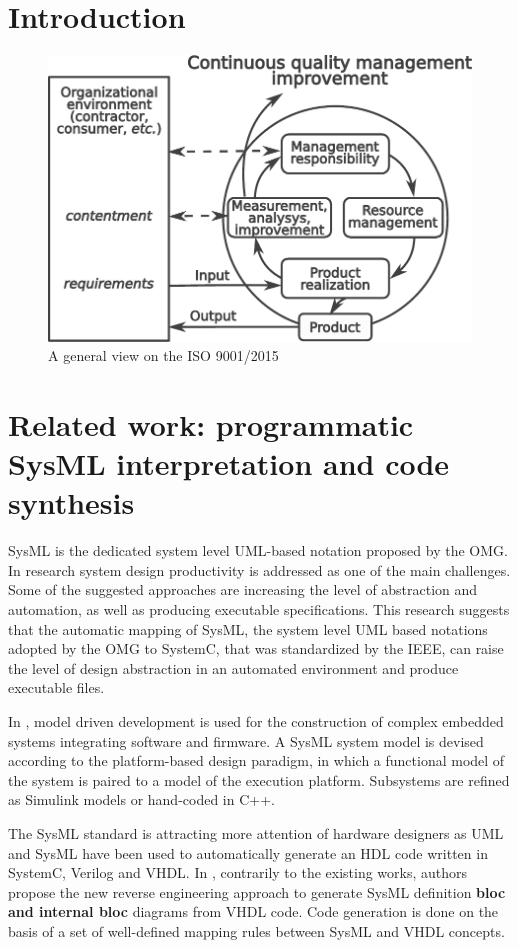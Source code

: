 \documentclass{llncs}
\begin{document}
\section{Introduction}
\label{sec:intro}

\begin{figure}[htb]
  \centering
  \includegraphics[width=0.6\linewidth]{qms-pics/iso9001.pdf}
  \caption{A general view on the ISO 9001/2015}
  \label{fig:iso9001}
\end{figure}


\section{Related work: programmatic SysML interpretation and code synthesis}

SysML is the dedicated system level UML-based notation proposed by the OMG. In research \cite{raslan} system design productivity is addressed as one of the main challenges. Some of the suggested approaches are increasing the level of abstraction and automation, as well as producing executable specifications. This research suggests that the automatic mapping of SysML, the system level UML based notations adopted by the OMG to SystemC, that was standardized by the IEEE, can raise the level of design abstraction in an automated environment and produce executable files.

In \cite{natale}, model driven development is used for the construction of complex embedded systems integrating software and firmware. A SysML system model is devised according to the platform-based design paradigm, in which a functional model of the system is paired to a model of the execution platform. Subsystems are refined as Simulink models or hand-coded in C++.

The SysML standard is attracting more attention of hardware designers as UML and SysML have been used to automatically generate an HDL code written in SystemC, Verilog and VHDL. In \cite{boute}, contrarily to the existing works, authors propose the new reverse engineering approach to generate SysML definition \textbf{bloc and internal bloc} diagrams from VHDL code. Code generation is done on the basis of a set of well-defined mapping rules between SysML and VHDL concepts.
\end{document}
